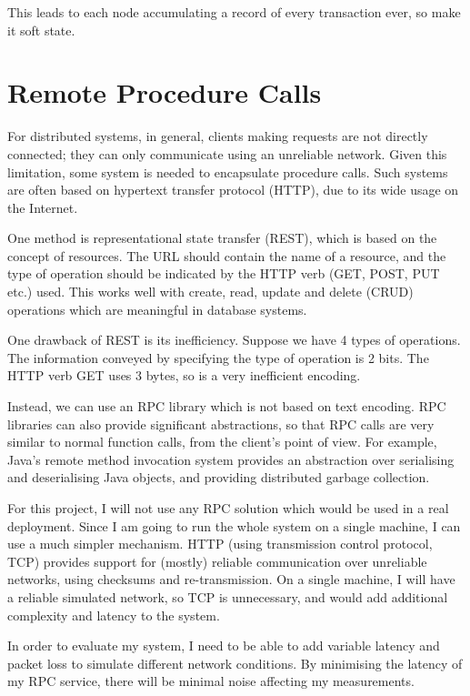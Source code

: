 \documentclass[12pt,a4paper,twoside,openright]{report}
\begin{document}
This leads to each node accumulating a record of every transaction ever, so make it soft state.

\section{Remote Procedure Calls}

For distributed systems, in general, clients making requests are not directly connected; they can only communicate using an unreliable network. Given this limitation, some system is needed to encapsulate procedure calls. Such systems are often based on hypertext transfer protocol (HTTP), due to its wide usage on the Internet.

One method is representational state transfer (REST), which is based on the concept of resources. The URL should contain the name of a resource, and the type of operation should be indicated by the HTTP verb (GET, POST, PUT etc.) used. This works well with create, read, update and delete (CRUD) operations which are meaningful in database systems.

One drawback of REST is its inefficiency. Suppose we have 4 types of operations. The information conveyed by specifying the type of operation is 2 bits. The HTTP verb GET uses 3 bytes, so is a very inefficient encoding.

Instead, we can use an RPC library which is not based on text encoding. RPC libraries can also provide significant abstractions, so that RPC calls are very similar to normal function calls, from the client's point of view. For example, Java's remote method invocation system provides an abstraction over serialising and deserialising Java objects, and providing distributed garbage collection.

For this project, I will not use any RPC solution which would be used in a real deployment. Since I am going to run the whole system on a single machine, I can use a much simpler mechanism. HTTP (using transmission control protocol, TCP) provides support for (mostly) reliable communication over unreliable networks, using checksums and re-transmission. On a single machine, I will have a reliable simulated network, so TCP is unnecessary, and would add additional complexity and latency to the system.

In order to evaluate my system, I need to be able to add variable latency and packet loss to simulate different network conditions. By minimising the latency of my RPC service, there will be minimal noise affecting my measurements.
\end{document}
